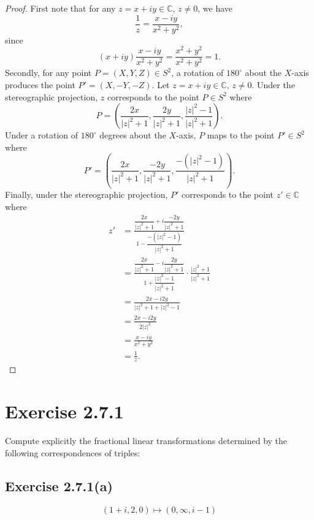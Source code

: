 \documentclass[12pt]{article}
\newenvironment{problem}
    {\begin{lrbox}{\mybox}\begin{minipage}{\textwidth-10pt}}
    {\end{minipage}\end{lrbox}\framebox[6.5in]{\usebox{\mybox}}}
\newcommand{\C}{\mathbb{C}}
\begin{document}
\begin{proof}
    First note that for any $z=x+iy\in\C$, $z\ne 0$, we have
    \[\frac1z = \frac{x-iy}{x^2+y^2},\]
    since
    \[(x+iy)\frac{x-iy}{x^2+y^2} = \frac{x^2+y^2}{x^2+y^2} = 1.\]
    Secondly, for any point $P=(X,Y,Z)\in S^2$, a rotation of $180^\circ$ about the $X$-axis produces the point $P'=(X,-Y,-Z)$. Let $z=x+iy\in\C$, $z\ne0$. Under the stereographic projection, $z$ corresponds to the point $P\in S^2$ where
    \[P = \left(\frac{2x}{|z|^2+1}, \frac{2y}{|z|^2+1}, \frac{|z|^2-1}{|z|^2+1}\right).\]
    Under a rotation of $180^\circ$ degrees about the $X$-axis, $P$ maps to the point $P'\in S^2$ where
    \[P' = \left(\frac{2x}{|z|^2+1}, \frac{-2y}{|z|^2+1}, \frac{-(|z|^2-1)}{|z|^2+1}\right).\]
    Finally, under the stereographic projection, $P'$ corresponds to the point $z'\in\C$ where
    \begin{align*}
        z'
            &= \frac{\dfrac{2x}{|z|^2+1} + i\dfrac{-2y}{|z|^2+1}}{1-\dfrac{-(|z|^2-1)}{|z|^2+1}} \\[1em]
            &= \frac{\dfrac{2x}{|z|^2+1} - i\dfrac{2y}{|z|^2+1}}{1+\dfrac{|z|^2-1}{|z|^2+1}} \cdot \frac{|z|^2+1}{|z|^2+1}\\[1em]
            &= \frac{2x - i2y}{|z|^2+1+|z|^2-1}\\[1em]
            &= \frac{2x - i2y}{2|z|^2}\\[1em]
            &= \frac{x - iy}{x^2 + y^2} \\[1em]
            &= \frac1z.
    \end{align*}
    
\end{proof}

\newpage
\section*{Exercise 2.7.1}
\begin{problem}
    Compute explicitly the fractional linear transformations determined by the following correspondences of triples:
\end{problem}

\subsection*{Exercise 2.7.1(a)}
\begin{problem}
    \[(1+i, 2, 0)\mapsto(0, \infty, i-1)\]
\end{problem}
\medskip
\end{document}
